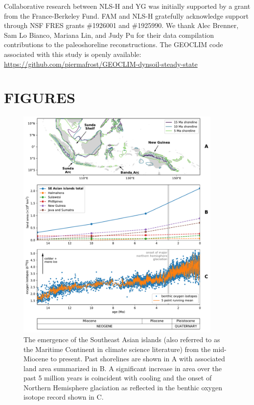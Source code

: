 \documentclass[11pt,letterpaper]{article}
\begin{document}
Collaborative research between NLS-H and YG was initially supported by a grant from the France-Berkeley Fund. FAM and NLS-H gratefully acknowledge support through NSF FRES grants \#1926001 and \#1925990. We thank Alec Brenner, Sam Lo Bianco, Mariana Lin, and Judy Pu for their data compilation contributions to the paleoshoreline reconstructions. The GEOCLIM code associated with this study is openly available: \url{https://github.com/piermafrost/GEOCLIM-dynsoil-steady-state}

\clearpage
\newpage

\section*{FIGURES}

\begin{figure}[h!]
    \centering
    \includegraphics[width=0.9\textwidth]{Figures/shoreline_growth.pdf}
    \caption{The emergence of the Southeast Asian islands (also referred to as the Maritime Continent in climate science literature) from the mid-Miocene to present. Past shorelines are shown in A with associated land area summarized in B. A significant increase in area over the past 5 million years is coincident with cooling and the onset of Northern Hemisphere glaciation as reflected in the benthic oxygen isotope record \cite{Zachos2008a} shown in C.}
    \label{fig:shoreline_growth}
\end{figure}
\end{document}
